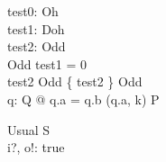\documentclass{article}
\begin{document}


\begin{axdef}
   test0: Oh \\
   test1: Doh \\
   test2: Odd \\
   \Delta Odd %
\where
   test1 = 0 
   \\
   test2 \in Odd \land \{ test2 \} \subseteq Odd
   \\
   \forall q: Q @ q.a = q.b \land (q.a, k) \in P   
\end{axdef}

\begin{schema}{Usual}
   \Delta S \\
   i?, o!: \nat
\where
    true
\end{schema}
\end{document}
